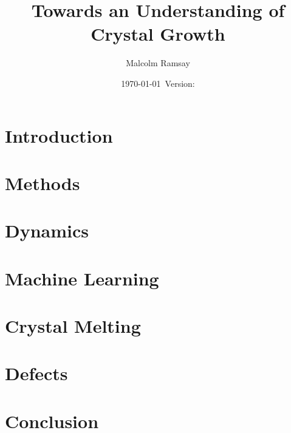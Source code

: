 \documentclass[12pt, a4paper]{report}
\title{Towards an Understanding of Crystal Growth}
\author{Malcolm Ramsay}
\date{\today{}~Version: \version}
\begin{document}
\beforepreface{}
\afterpreface{}

\chapter{Introduction}

\chapter{Methods}





\chapter{Dynamics}




\chapter{Machine Learning}




\chapter{Crystal Melting}




\chapter{Defects}




\chapter{Conclusion}

\printbibliography{}
\end{document}
